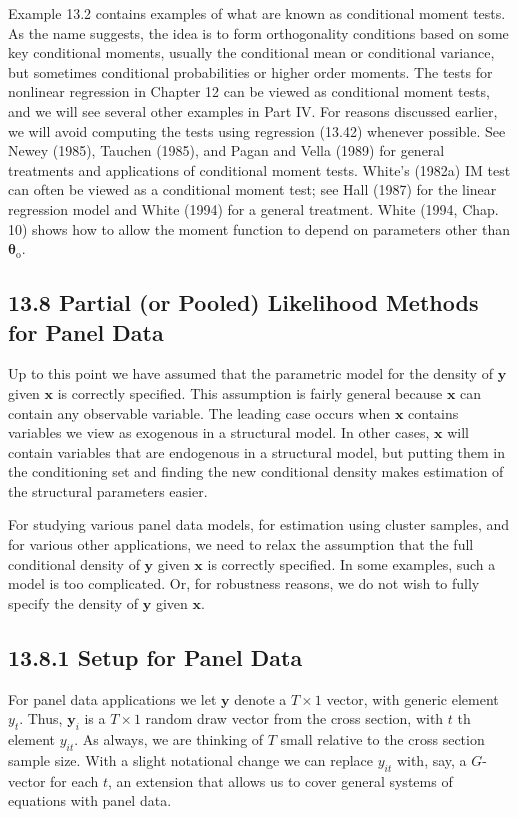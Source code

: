 \documentclass[10pt]{article}
\begin{document}
Example 13.2 contains examples of what are known as conditional moment tests. As the name suggests, the idea is to form orthogonality conditions based on some key conditional moments, usually the conditional mean or conditional variance, but sometimes conditional probabilities or higher order moments. The tests for nonlinear regression in Chapter 12 can be viewed as conditional moment tests, and we will see several other examples in Part IV. For reasons discussed earlier, we will avoid computing the tests using regression (13.42) whenever possible. See Newey (1985), Tauchen (1985), and Pagan and Vella (1989) for general treatments and applications of conditional moment tests. White's (1982a) IM test can often be viewed as a conditional moment test; see Hall (1987) for the linear regression model and White (1994) for a general treatment. White (1994, Chap. 10) shows how to allow the moment function to depend on parameters other than $\boldsymbol{\theta}_{\mathrm{o}}$.

\subsection*{13.8 Partial (or Pooled) Likelihood Methods for Panel Data}
Up to this point we have assumed that the parametric model for the density of $\mathbf{y}$ given $\mathbf{x}$ is correctly specified. This assumption is fairly general because $\mathbf{x}$ can contain any observable variable. The leading case occurs when $\mathbf{x}$ contains variables we view as exogenous in a structural model. In other cases, $\mathbf{x}$ will contain variables that are endogenous in a structural model, but putting them in the conditioning set and finding the new conditional density makes estimation of the structural parameters easier.

For studying various panel data models, for estimation using cluster samples, and for various other applications, we need to relax the assumption that the full conditional density of $\mathbf{y}$ given $\mathbf{x}$ is correctly specified. In some examples, such a model is too complicated. Or, for robustness reasons, we do not wish to fully specify the density of $\mathbf{y}$ given $\mathbf{x}$.

\subsection*{13.8.1 Setup for Panel Data}
For panel data applications we let $\mathbf{y}$ denote a $T \times 1$ vector, with generic element $y_{t}$. Thus, $\mathbf{y}_{i}$ is a $T \times 1$ random draw vector from the cross section, with $t$ th element $y_{i t}$. As always, we are thinking of $T$ small relative to the cross section sample size. With a slight notational change we can replace $y_{i t}$ with, say, a $G$-vector for each $t$, an extension that allows us to cover general systems of equations with panel data.
\end{document}

